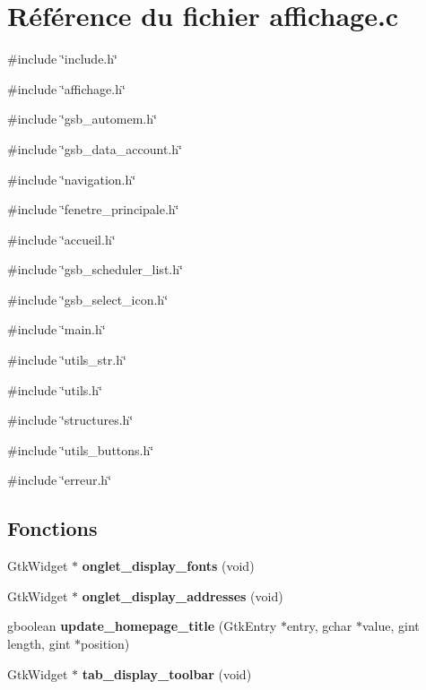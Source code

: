 \section{Référence du fichier affichage.c}
\label{affichage_8c}
{\ttfamily \#include \char`\"{}include.h\char`\"{}}\par
{\ttfamily \#include \char`\"{}affichage.h\char`\"{}}\par
{\ttfamily \#include \char`\"{}gsb\_\-automem.h\char`\"{}}\par
{\ttfamily \#include \char`\"{}gsb\_\-data\_\-account.h\char`\"{}}\par
{\ttfamily \#include \char`\"{}navigation.h\char`\"{}}\par
{\ttfamily \#include \char`\"{}fenetre\_\-principale.h\char`\"{}}\par
{\ttfamily \#include \char`\"{}accueil.h\char`\"{}}\par
{\ttfamily \#include \char`\"{}gsb\_\-scheduler\_\-list.h\char`\"{}}\par
{\ttfamily \#include \char`\"{}gsb\_\-select\_\-icon.h\char`\"{}}\par
{\ttfamily \#include \char`\"{}main.h\char`\"{}}\par
{\ttfamily \#include \char`\"{}utils\_\-str.h\char`\"{}}\par
{\ttfamily \#include \char`\"{}utils.h\char`\"{}}\par
{\ttfamily \#include \char`\"{}structures.h\char`\"{}}\par
{\ttfamily \#include \char`\"{}utils\_\-buttons.h\char`\"{}}\par
{\ttfamily \#include \char`\"{}erreur.h\char`\"{}}\par
\subsection*{Fonctions}
\begin{DoxyCompactItemize}
\item 
GtkWidget $\ast$ {\bf onglet\_\-display\_\-fonts} (void)
\item 
GtkWidget $\ast$ {\bf onglet\_\-display\_\-addresses} (void)
\item 
gboolean {\bf update\_\-homepage\_\-title} (GtkEntry $\ast$entry, gchar $\ast$value, gint length, gint $\ast$position)
\item 
GtkWidget $\ast$ {\bf tab\_\-display\_\-toolbar} (void)
\end{DoxyCompactItemize}
